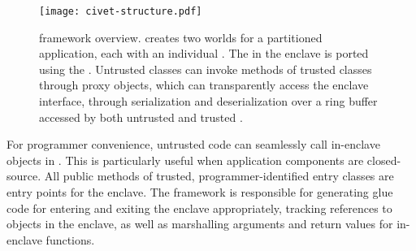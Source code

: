 

\begin{figure}[t!]
\centering
\texttt{[image: civet-structure.pdf]}
\caption{\sysname{} framework overview.
\sysname{} creates two worlds for a partitioned \java{} application, each with an individual \jvm{}.
The \jvm{} in the enclave is ported using the \graphene{} \libos{}.
Untrusted classes can invoke methods of trusted classes through proxy objects,
which can transparently access the enclave interface, through serialization
and deserialization over a ring buffer accessed by both untrusted and trusted \jvm{}. }
\label{fig:runtime}
\end{figure}


\label{sec:concept:accessing}

For programmer convenience, 
untrusted code can seamlessly call in-enclave objects in \sysname{}.
This is particularly useful when application components are closed-source.
All public methods of trusted, programmer-identified entry classes are entry points for the enclave.
The \sysname{} \dynamicphase{} framework is responsible for generating glue code for entering and exiting
the enclave appropriately, tracking references to objects in the enclave, 
as well as marshalling arguments and return values for in-enclave functions.

